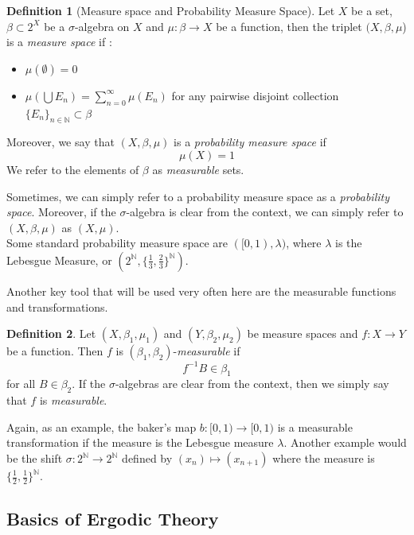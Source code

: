 \documentclass{article}
\theoremstyle{definition}
\newtheorem{definition}{Definition}[section]
\begin{document}
\begin{definition}[Measure space and Probability Measure Space]
    Let $X$ be a set, $\beta \subset 2^X$ be a $\sigma$-algebra on $X$ and $\mu : \beta \to X$ be a function, then the triplet $(X,\beta, \mu$) is a \textit{measure space} if :
    \begin{itemize}
        \item $\mu (\emptyset) = 0$
        \item $\mu \left( \bigcup E_n \right) = \sum_{n=0}^{\infty}\mu(E_n)$ for any pairwise disjoint collection $\{E_n\}_{n\in\mathbb{N}}\subset\beta$
    \end{itemize}
    Moreover, we say that $(X,\beta, \mu)$ is a \textit{probability measure space} if $$\mu (X) = 1$$ We refer to the elements of $\beta$ as \textit{measurable} sets.\\
\end{definition}

Sometimes, we can simply refer to a probability measure space as a \textit{probability space}. Moreover, if the $\sigma$-algebra is clear from the context, we can simply refer to $(X,\beta,\mu)$ as $(X,\mu)$.\\
Some standard probability measure space are $([0,1), \lambda)$, where $\lambda$ is the Lebesgue Measure, or $(2^{\mathbb{N}}, \{\frac13,\frac23\}^{\mathbb{N}})$.

Another key tool that will be used very often here are the measurable functions and transformations.

\begin{definition}
    Let $(X,\beta_1,\mu_1)$ and $(Y,\beta_2,\mu_2)$ be measure spaces and $f:X\to Y$ be a function. Then $f$ is $(\beta_1,\beta_2)$-\textit{measurable} if $$f^{-1}B\in\beta_1$$ for all $B\in\beta_2$. If the $\sigma$-algebras are clear from the context, then we simply say that $f$ is \textit{measurable}.\\
\end{definition}

Again, as an example, the baker's map $b:[0,1)\to [0,1)$ is a measurable transformation if the measure is the Lebesgue measure $\lambda$. Another example would be the shift $\sigma :2^\mathbb{N} \to 2^\mathbb{N}$ defined by $(x_n)\mapsto (x_{n+1})$ where the measure is $\{ \frac12,\frac12 \}^{\mathbb{N}}$.

\subsection{Basics of Ergodic Theory}
\end{document}
